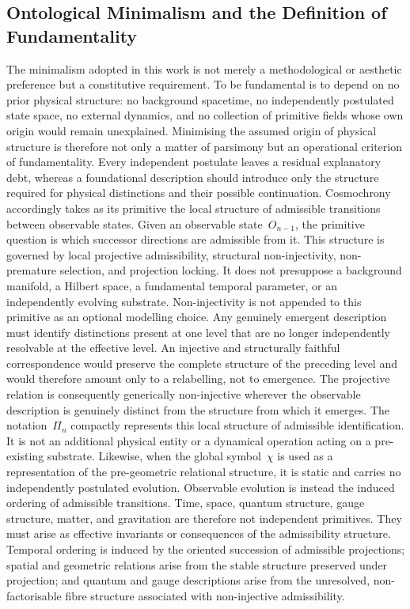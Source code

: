 \subsection{Ontological Minimalism and the Definition of Fundamentality}
  \label{subsec:minimalism-as-a-guiding-principle}

  The minimalism adopted in this work is not merely a methodological or aesthetic
  preference but a constitutive requirement.
  To be fundamental is to depend on no prior physical structure: no background
  spacetime, no independently postulated state space, no external dynamics, and no
  collection of primitive fields whose own origin would remain unexplained.
  Minimising the assumed origin of physical structure is therefore not only a matter
  of parsimony but an operational criterion of fundamentality.
  Every independent postulate leaves a residual explanatory debt, whereas a
  foundational description should introduce only the structure required for physical
  distinctions and their possible continuation.
  Cosmochrony accordingly takes as its primitive the local structure of admissible
  transitions between observable states.
  Given an observable state~$O_{n-1}$, the primitive question is which successor
  directions are admissible from it.
  This structure is governed by local projective admissibility, structural
  non-injectivity, non-premature selection, and projection locking.
  It does not presuppose a background manifold, a Hilbert space, a fundamental
  temporal parameter, or an independently evolving substrate.
  Non-injectivity is not appended to this primitive as an optional modelling choice.
  Any genuinely emergent description must identify distinctions present at one level
  that are no longer independently resolvable at the effective level.
  An injective and structurally faithful correspondence would preserve the complete
  structure of the preceding level and would therefore amount only to a relabelling,
  not to emergence.
  The projective relation is consequently generically non-injective wherever the
  observable description is genuinely distinct from the structure from which it
  emerges.
  The notation~$\Pi_n$ compactly represents this local structure of admissible
  identification.
  It is not an additional physical entity or a dynamical operation acting on a
  pre-existing substrate.
  Likewise, when the global symbol~$\chi$ is used as a representation of the
  pre-geometric relational structure, it is static and carries no independently
  postulated evolution.
  Observable evolution is instead the induced ordering of admissible transitions.
  Time, space, quantum structure, gauge structure, matter, and gravitation are
  therefore not independent primitives.
  They must arise as effective invariants or consequences of the admissibility
  structure.
  Temporal ordering is induced by the oriented succession of admissible projections;
  spatial and geometric relations arise from the stable structure preserved under
  projection; and quantum and gauge descriptions arise from the unresolved,
  non-factorisable fibre structure associated with non-injective admissibility.
